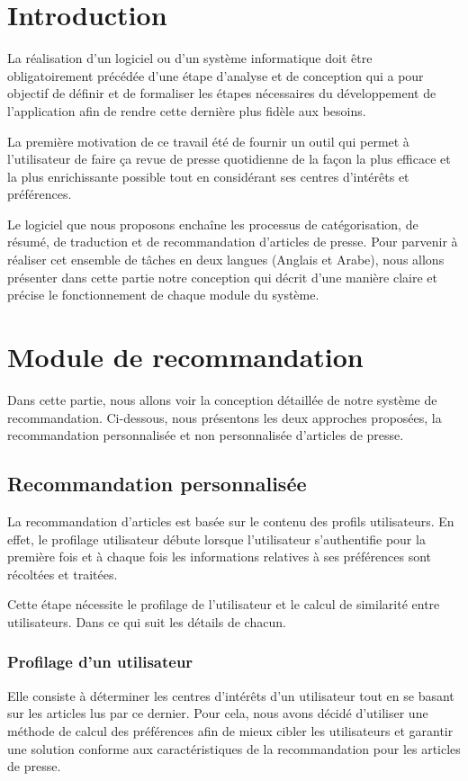 
\newpage
\section{Introduction}
La réalisation d'un logiciel ou d'un système informatique doit être obligatoirement précédée d'une étape d'analyse et de conception qui a pour objectif de définir et de formaliser les étapes nécessaires du développement de l'application afin de rendre cette dernière plus fidèle aux besoins.

La première motivation de ce travail été de fournir un outil qui permet à l'utilisateur de faire ça revue de presse quotidienne de la façon la plus efficace et la plus enrichissante possible tout en considérant ses centres d'intérêts et préférences. 

Le logiciel que nous proposons enchaîne les processus de catégorisation, de résumé, de traduction et de recommandation d'articles de presse. Pour parvenir à réaliser cet ensemble de tâches en deux langues (Anglais et Arabe), nous allons présenter dans cette partie notre conception qui décrit d'une manière claire et précise le fonctionnement de chaque module du système. 


\section{Module de recommandation}
Dans cette partie, nous allons voir la conception détaillée de notre système de recommandation. Ci-dessous, nous présentons les deux approches proposées, la recommandation personnalisée et non personnalisée d'articles de presse.
    \subsection{Recommandation personnalisée\label{personal}}
    La recommandation d'articles est basée sur le contenu des profils utilisateurs. En effet, le profilage utilisateur débute lorsque l'utilisateur s'authentifie pour la première fois et à chaque fois les informations relatives à ses préférences sont récoltées et traitées.

    Cette étape nécessite le profilage de l'utilisateur et le calcul de similarité entre utilisateurs. Dans ce qui suit les détails de chacun.

        \subsubsection{Profilage d'un utilisateur}
        Elle consiste à déterminer les centres d'intérêts d'un utilisateur tout en se basant sur les articles lus par ce dernier. Pour cela, nous avons décidé d'utiliser une méthode de calcul des préférences afin de mieux cibler les utilisateurs et garantir une solution conforme aux caractéristiques de la recommandation pour les articles de presse. 


